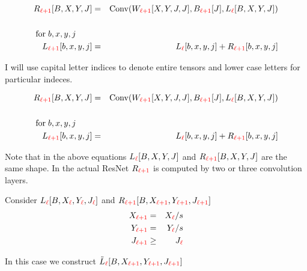 {\medskip
\begin{eqnarray*}
R_{\color{red} \ell+1}[B,X,Y,J] & = & \mathrm{Conv}(W_{\color{red} \ell+1}[X,Y,J,J],B_{\color{red} \ell+1}[J],L_{\color{red} \ell}[B,X,Y,J]) \\
\\
\mathrm{for}\;b,x,y,j\;\;\;\;\;\;\;\\
L_{\color{red} \ell+1}[b,x,y,j] & = & L_{\color{red}\ell}[b,x,y,j] + R_{\color{red} \ell+1}[b,x,y,j]
\end{eqnarray*}

\vfill I will use capital letter indices to denote entire tensors and lower case letters for particular indeces.


\medskip
\begin{eqnarray*}
R_{\color{red} \ell+1}[B,X,Y,J] & = & \mathrm{Conv}(W_{\color{red} \ell+1}[X,Y,J,J],B_{\color{red} \ell+1}[J],L_{\color{red} \ell}[B,X,Y,J]) \\
\\
\mathrm{for}\;b,x,y,j\;\;\;\;\;\;\;\\
L_{\color{red} \ell+1}[b,x,y,j] & = & L_{\color{red}\ell}[b,x,y,j] + R_{\color{red} \ell+1}[b,x,y,j]
\end{eqnarray*}

\vfill Note that in the above equations $L_{\color{red} \ell}[B,X,Y,J]$ and $R_{\color{red} \ell+1}[B,X,Y,J]$ are the same shape.
\vfill
In the actual ResNet $R_{\color{red} \ell+1}$ is computed by two or three convolution layers.


Consider $L_{\color{red} \ell}[B,X_{\color{red} \ell},Y_{\color{red} \ell},J_{\color{red} \ell}]$ and $R_{\color{red} \ell+1}[B,X_{\color{red} \ell+1},Y_{\color{red} \ell+1},J_{\color{red} \ell+1}]$
\begin{eqnarray*}
X_{\color{red} \ell+1} & = & X_{\color{red} \ell}/s \\
Y_{\color{red} \ell+1} & = & Y_{\color{red} \ell}/s \\
J_{\color{red} \ell+1} & \geq &  J_{\color{red} \ell}
\end{eqnarray*}


\vfill
In this case we construct $\tilde{L}_{\color{red} \ell}[B,X_{\color{red} \ell +1},Y_{\color{red} \ell+1},J_{\color{red}\ell +1}]$

}
